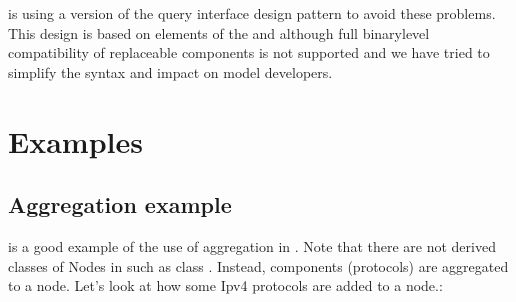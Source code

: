 \documentclass[letterpaper,10pt,english]{sphinxmanual}
\renewcommand{\sphinxcode}[1]{\texttt{\small{#1}}}
\begin{document}
 is using a version of the query interface design pattern to avoid these
problems. This design is based on elements of the  and  although full
binary\sphinxhyphen{}level compatibility of replaceable components is not supported and we
have tried to simplify the syntax and impact on model developers.


\section{Examples}
\label{\detokenize{object-model:examples}}

\subsection{Aggregation example}
\label{\detokenize{object-model:aggregation-example}}
\sphinxcode{} is a good example of the use of aggregation in .  Note
that there are not derived classes of Nodes in  such as class
\sphinxcode{}.  Instead, components (protocols) are aggregated to a
node. Let’s look at how some Ipv4 protocols are added to a node.:

\begin{sphinxVerbatim}[commandchars=\\\{\}]
 
 
      
   
   
      
   
   
\end{sphinxVerbatim}
\end{document}
